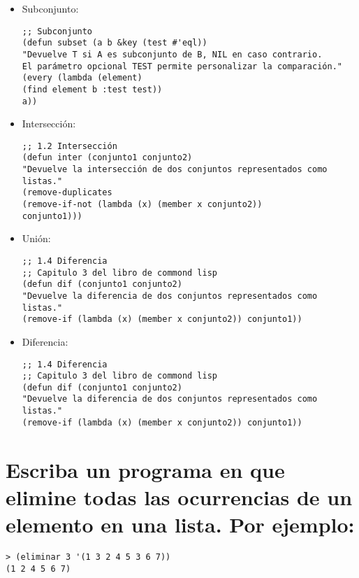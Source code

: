 \documentclass[11pt, letterpaper]{article}
\begin{document}
\begin{itemize}
	\item Subconjunto:
	
	\begin{verbatim}
;; Subconjunto
(defun subset (a b &key (test #'eql))
"Devuelve T si A es subconjunto de B, NIL en caso contrario.
El parámetro opcional TEST permite personalizar la comparación."
(every (lambda (element)
(find element b :test test))
a))
	\end{verbatim}
	
	\item Intersección:
	
	\begin{verbatim}
;; 1.2 Intersección
(defun inter (conjunto1 conjunto2)
"Devuelve la intersección de dos conjuntos representados como listas."
(remove-duplicates
(remove-if-not (lambda (x) (member x conjunto2))
conjunto1)))
	\end{verbatim}
	
	\item Unión:
	
	\begin{verbatim}
;; 1.4 Diferencia
;; Capitulo 3 del libro de commond lisp
(defun dif (conjunto1 conjunto2)
"Devuelve la diferencia de dos conjuntos representados como listas."
(remove-if (lambda (x) (member x conjunto2)) conjunto1))

	\end{verbatim}
	
	\item Diferencia:
	
	\begin{verbatim}
;; 1.4 Diferencia
;; Capitulo 3 del libro de commond lisp
(defun dif (conjunto1 conjunto2)
"Devuelve la diferencia de dos conjuntos representados como listas."
(remove-if (lambda (x) (member x conjunto2)) conjunto1))
	\end{verbatim}
\end{itemize}

\newpage


\section{Escriba un programa en que elimine todas las ocurrencias de un elemento en una lista. Por ejemplo:}

\begin{itemize}
\begin{verbatim}
> (eliminar 3 '(1 3 2 4 5 3 6 7))
(1 2 4 5 6 7)
\end{verbatim}
\end{itemize}
\end{document}

